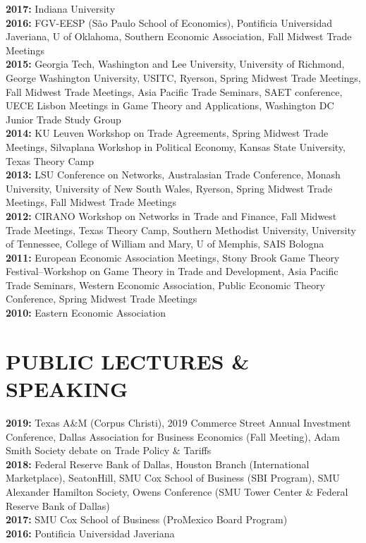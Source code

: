 \documentclass[11pt]{res}
\begin{document}
\begin{resume}
{\bf 2017:} Indiana University \vspace{1.5mm}\\
{\bf 2016:} FGV-EESP (S\~ao Paulo School of Economics), Pontificia Universidad Javeriana, U of Oklahoma, Southern Economic Association, Fall Midwest Trade Meetings\vspace{1.5mm}\\
{\bf 2015:} Georgia Tech, Washington and Lee University, University of Richmond, George Washington University, USITC, Ryerson, Spring Midwest Trade Meetings, Fall Midwest Trade Meetings, Asia Pacific Trade Seminars, SAET conference, UECE Lisbon Meetings in Game Theory and Applications, Washington DC Junior Trade Study Group\vspace{1.5mm}\\
{\bf 2014:} KU Leuven Workshop on Trade Agreements, Spring Midwest Trade Meetings, Silvaplana Workshop in Political Economy, Kansas State University, Texas Theory Camp\vspace{1.5mm}\\
{\bf 2013:} LSU Conference on Networks, Australasian Trade Conference, Monash University, University of New South Wales, Ryerson, Spring Midwest Trade Meetings, Fall Midwest Trade Meetings \vspace{1.5mm}\\
{\bf 2012:} CIRANO Workshop on Networks in Trade and Finance, Fall Midwest Trade Meetings, Texas Theory Camp, Southern Methodist University, University of Tennessee, College of William and Mary, U of Memphis, SAIS Bologna\vspace{1.5mm}\\
{\bf 2011:} European Economic Association Meetings, Stony Brook Game Theory Festival--Workshop on Game Theory in Trade and Development, Asia Pacific Trade Seminars, Western Economic Association, Public Economic Theory Conference, Spring Midwest Trade Meetings\vspace{1.5mm}\\
{\bf 2010:} Eastern Economic Association

\section{PUBLIC LECTURES \& SPEAKING}\vspace{1.5mm}
{\bf 2019:} Texas A\&M (Corpus Christi), 2019 Commerce Street Annual Investment Conference, Dallas Association for Business Economics (Fall Meeting), Adam Smith Society debate on Trade Policy \& Tariffs\vspace{1.5mm}\\
{\bf 2018:} Federal Reserve Bank of Dallas, Houston Branch (International Marketplace), SeatonHill, SMU Cox School of Business (SBI Program), SMU Alexander Hamilton Society, Owens Conference (SMU Tower Center \& Federal Reserve Bank of Dallas)\vspace{1.5mm}\\
{\bf 2017:} SMU Cox School of Business (ProMexico Board Program)\vspace{1.5mm}\\
{\bf 2016:} Pontificia Universidad Javeriana


\end{resume}
\end{document}
